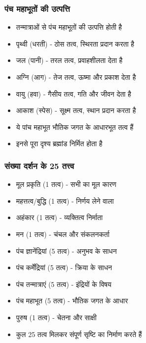 \begin{frame}[fragile]\frametitle{पंच महाभूतों की उत्पत्ति}
      \begin{itemize}
          \item तन्मात्राओं से पंच महाभूतों की उत्पत्ति होती है
          \item पृथ्वी (धरती) - ठोस तत्व, स्थिरता प्रदान करता है
          \item जल (पानी) - तरल तत्व, प्रवाहशीलता देता है
          \item अग्नि (आग) - तेज तत्व, ऊष्मा और प्रकाश देता है
          \item वायु (हवा) - गैसीय तत्व, गति और जीवन देता है
          \item आकाश (स्पेस) - सूक्ष्म तत्व, स्थान प्रदान करता है
          \item ये पांच महाभूत भौतिक जगत के आधारभूत तत्व हैं
          \item इनसे पूरा दृश्य ब्रह्मांड निर्मित होता है
      \end{itemize}
\end{frame}

\begin{frame}[fragile]\frametitle{संख्या दर्शन के 25 तत्त्व}
      \begin{itemize}
          \item मूल प्रकृति (1 तत्व) - सभी का मूल कारण
          \item महत्तत्व/बुद्धि (1 तत्व) - निर्णय लेने वाला
          \item अहंकार (1 तत्व) - व्यक्तित्व निर्माता
          \item मन (1 तत्व) - चंचल और संकलनकर्ता
          \item पंच ज्ञानेंद्रियां (5 तत्व) - अनुभव के साधन
          \item पंच कर्मेंद्रियां (5 तत्व) - क्रिया के साधन
          \item पंच तन्मात्राएं (5 तत्व) - इंद्रियों के विषय
          \item पंच महाभूत (5 तत्व) - भौतिक जगत के आधार
          \item पुरुष (1 तत्व) - चेतना और साक्षी
          \item कुल 25 तत्व मिलकर संपूर्ण सृष्टि का निर्माण करते हैं
      \end{itemize}
\end{frame}

